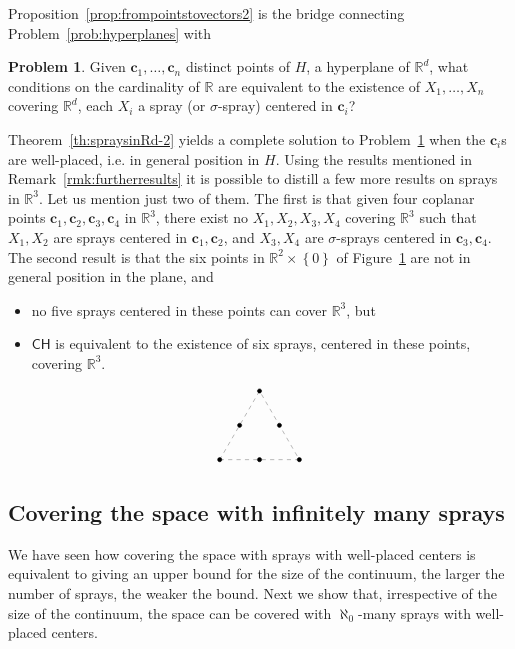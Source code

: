 \documentclass[12pt]{amsart}
\newcommand{\CH}{{\mathsf{CH}}}	%
\newcommand{\R}{\mathbb{R}}	%
\newcommand{\setLR}[1]{\left \{ {#1} \right \}} %
\theoremstyle{plain}
\theoremstyle{definition}
\newtheorem{problem}[theorem]{Problem}
\theoremstyle{remark}
\begin{document}
Proposition~\ref{prop:frompointstovectors2} is the bridge connecting Problem~\ref{prob:hyperplanes} with
\begin{problem}\label{prob:sprays}
Given \( \mathbf{c}_1 , \dots , \mathbf{c}_n \) distinct points of \( H \), a hyperplane of \( \R^d \), what conditions on the cardinality of \( \R \) are equivalent to the existence of \( X_1 , \dots , X_n \) covering \( \R^d \), each \( X_i \) a spray (or \( \sigma \)-spray) centered in \( \mathbf{c}_i \)?
\end{problem}
Theorem~\ref{th:spraysinRd-2} yields a complete solution to Problem~\ref{prob:sprays} when the \( \mathbf{c}_i \)s are well-placed, i.e. in general position in \( H \).
Using the results mentioned in Remark~\ref{rmk:furtherresults} it is possible to distill a few more results on sprays in \( \R^3 \).
Let us mention just two of them.
The first is that given four coplanar points \( \mathbf{c}_1 , \mathbf{c}_2 , \mathbf{c}_3 , \mathbf{c}_4 \) in \( \R^3 \), there exist no \( X_1 , X_2 , X_3 , X_4 \) covering \( \R^3 \) such that \( X_1 , X_2 \) are sprays centered in \( \mathbf{c}_1 , \mathbf{c}_2 \), and \( X_3 , X_4 \) are \( \sigma \)-sprays centered in \( \mathbf{c}_3 , \mathbf{c}_4 \).
The second result is that the six points in \( \R^2 \times \setLR{0} \) of Figure~\ref{fig:2} are not in general position in the plane, and 
\begin{itemize}
\item
no five sprays centered in these points can cover \( \R^3 \), but 
\item
\( \CH \) is equivalent to the existence of six sprays, centered in these points, covering \( \R^3 \).
\end{itemize}

\begin{figure}
\[
\begin{tikzpicture}
\draw[very thin, dashed] (0,0)--(2 , 0)-- (1, 1.73205)--cycle;
\filldraw (0,0) circle [radius=1.5pt] {};
\filldraw (1,0) circle [radius=1.5pt] {};
\filldraw (2,0) circle [radius=1.5pt] {};
\filldraw (1,1.73205) circle [radius=1.5pt] {};
\filldraw (0.5,0.866) circle [radius=1.5pt] {};
\filldraw (1.5,0.866) circle [radius=1.5pt] {};
\end{tikzpicture}
\]
\caption{}\label{fig:2}
\end{figure}

\subsection{Covering the space with infinitely many sprays}
We have seen how covering the space with sprays with well-placed centers is equivalent to giving an upper bound for the size of the continuum, the larger the number of sprays, the weaker the bound.
Next we show that, irrespective of the size of the continuum, the space can be covered with \( \aleph_0 \)-many sprays with well-placed centers.
\end{document}
